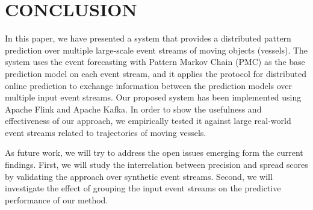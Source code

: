 
\section{CONCLUSION}
\label{sec:concl}
\par In this paper, we have presented a system that provides  a distributed pattern prediction over multiple large-scale event streams of moving objects (vessels). The system uses the event forecasting with Pattern Markov Chain (PMC) \cite{alevizos2017event} as the base prediction model on each event stream, and it applies the protocol for distributed online prediction \cite{kamp2014communication} to exchange information between the prediction models over multiple input event streams. Our proposed system has been implemented using Apache Flink and Apache Kafka. In order to show the usefulness and effectiveness of our approach, we empirically tested it against large real-world event streams related to trajectories of moving vessels.

\par As future work, we will try to address the open issues emerging form the current findings. First,  we will study the interrelation between precision and spread scores by validating the approach over synthetic event streams. Second, we will investigate the effect of grouping the input event streams on the predictive performance of our method.
